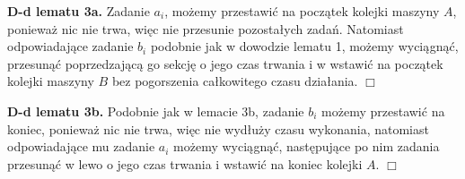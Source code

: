 \documentclass[11pt, wide]{article}
\begin{document}
    \textbf{D-d lematu 3a.}
    Zadanie $a_i$, możemy przestawić na początek kolejki maszyny $A$, ponieważ nic nie trwa, więc nie
    przesunie pozostałych zadań. Natomiast odpowiadające zadanie $b_i$
    podobnie jak w dowodzie lematu 1, możemy wyciągnąć, przesunąć poprzedzającą go sekcję o jego czas trwania
    i w wstawić na początek kolejki maszyny $B$ bez pogorszenia całkowitego czasu działania.
    \hspace*{12cm} $\Box$

    \textbf{D-d lematu 3b.}
    Podobnie jak w lemacie 3b, zadanie $b_i$ możemy przestawić na koniec, ponieważ nic nie trwa, więc nie wydłuży czasu wykonania,
    natomiast odpowiadające mu zadanie $a_i$ możemy wyciągnąć, następujące po nim zadania przesunąć w lewo o jego czas trwania i 
    wstawić na koniec kolejki $A$.
    \hspace*{12cm} $\Box$

    
\end{document}
